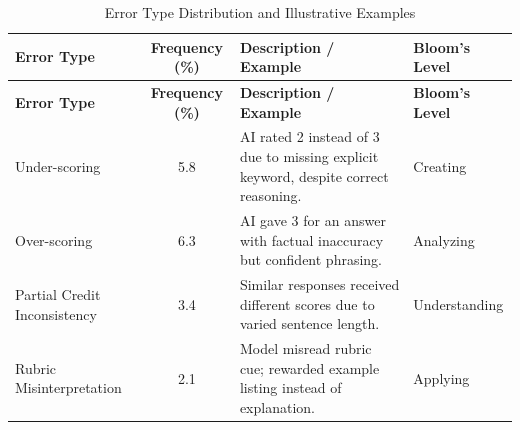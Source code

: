 {
\setlength{\LTleft}{-2.2cm}
\setlength{\LTright}{0pt}
\centering
\begin{longtable}{l c p{} l}
    \caption{Error Type Distribution and Illustrative Examples}
    \label{tab:error_examples}
    \\
    
    \hline
    \textbf{Error Type} & \textbf{Frequency (\%)} & \textbf{Description / Example} & \textbf{Bloom’s Level} \\
    \hline
    \endfirsthead

    \hline
    \textbf{Error Type} & \textbf{Frequency (\%)} & \textbf{Description / Example} & \textbf{Bloom’s Level} \\
    \hline
    \endhead

    \hline
    \endfoot

    Under-scoring & 5.8 & AI rated 2 instead of 3 due to missing explicit keyword, despite correct reasoning. & Creating \\
    Over-scoring & 6.3 & AI gave 3 for an answer with factual inaccuracy but confident phrasing. & Analyzing \\
    Partial Credit Inconsistency & 3.4 & Similar responses received different scores due to varied sentence length. & Understanding \\
    Rubric Misinterpretation & 2.1 & Model misread rubric cue; rewarded example listing instead of explanation. & Applying \\
 
\end{longtable}
}


